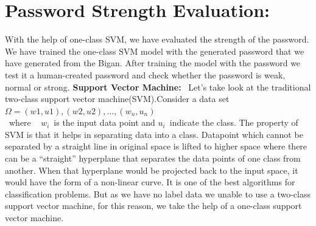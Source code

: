 \documentclass[runningheads]{llncs}
\begin{document}
\section{Password Strength Evaluation:}
With the help of one-class SVM, we have evaluated the strength of the password. We have trained the one-class SVM model\cite{1437839} with the generated password that we have generated from the Bigan. After training the model with the password we test it a human-created password and check whether the password is weak, normal or strong.
\newline
\hfill \break
\textbf{Support Vector Machine:} ~Let's take look at the traditional two-class support vector machine(SVM).Consider a data set $Ω={(w1,u1),(w2,u2) ,…,(w_n,u_n)}$\;\\ ~where ~ $w_i$\ is the input data point and $u_i$\ indicate the class. The property of SVM is that it helps in separating data into a class. Datapoint which cannot be separated by a straight line in original space is lifted to higher space where there can be a “straight” hyperplane that separates the data points of one class from another. When that hyperplane would be projected back to the input space, it would have the form of a non-linear curve. It is one of the best algorithms for classification problems. But as we have no label data we unable to use a two-class support vector machine, for this reason, we take the help of a one-class support vector machine.
\end{document}

